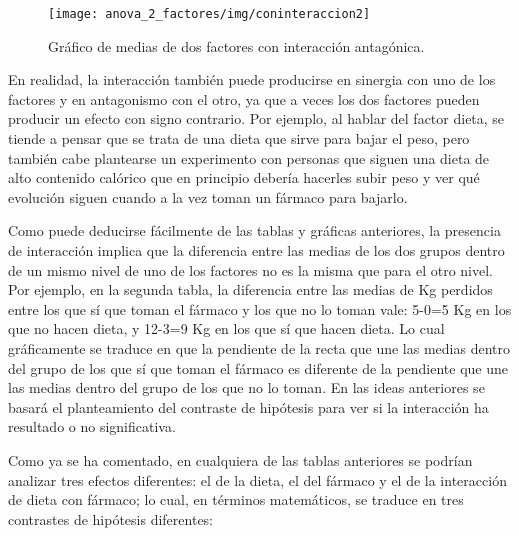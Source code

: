 \begin{figure}[h!]
\begin{center}
\texttt{[image: anova\_2\_factores/img/coninteraccion2]}
\caption{Gráfico de medias de dos factores con interacción antagónica.}
\end{center}
\end{figure}

En realidad, la interacción también puede producirse en sinergia con uno de los factores y en antagonismo con el otro, ya que a veces los
dos factores pueden producir un efecto con signo contrario. Por ejemplo, al hablar del factor dieta, se tiende a pensar que se trata de una
dieta que sirve para bajar el peso, pero también cabe plantearse un experimento con personas que siguen una dieta de alto contenido calórico
que en principio debería hacerles subir peso y ver qué evolución siguen cuando a la vez toman un fármaco para bajarlo.

Como puede deducirse fácilmente de las tablas y gráficas anteriores, la presencia de interacción implica que la diferencia entre las medias
de los dos grupos dentro de un mismo nivel de uno de los factores no es la misma que para el otro nivel. Por ejemplo, en la segunda tabla,
la diferencia entre las medias de Kg perdidos entre los que sí que toman el fármaco y los que no lo toman vale: 5-0=5 Kg en los que no hacen
dieta, y 12-3=9 Kg en los que sí que hacen dieta. Lo cual gráficamente se traduce en que la pendiente de la recta que une las medias dentro
del grupo de los que sí que toman el fármaco es diferente de la pendiente que une las medias dentro del grupo de los que no lo toman. En las
ideas anteriores se basará el planteamiento del contraste de hipótesis para ver si la interacción ha resultado o no significativa.

Como ya se ha comentado, en cualquiera de las tablas anteriores se podrían analizar tres efectos diferentes: el de la dieta, el del fármaco
y el de la interacción de dieta con fármaco; lo cual, en términos matemáticos, se traduce en tres contrastes de hipótesis diferentes:


